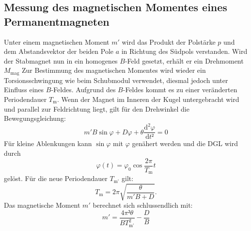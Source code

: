 \subsection{Messung des magnetischen Momentes eines Permanentmagneten}
Unter einem magnetischen Moment $m'$ wird das Produkt der Polstärke $p$
 und dem Abstandsvektor der beiden Pole $a$ in Richtung des Südpols verstanden.
  Wird der Stabmagnet nun in ein homogenes $B$-Feld gesetzt,
   erhält er ein Drehmoment $M_{\text{mag}}$
Zur Bestimmung des magnetischen Momentes wird wieder ein Torsionsschwingung wie
 beim Schubmodul verwendet, diesmal jedoch unter Einfluss eines $B$-Feldes.
  Aufgrund des $B$-Feldes kommt es zu einer veränderten Periodendauer $T_\text{m}$.  Wenn
  der Magnet im Inneren der Kugel untergebracht wird und parallel zur Feldrichtung
  liegt, gilt für den Drehwinkel \varphi die Bewegungsgleichung:
  \begin{equation}
    m'B\sin\varphi + D\varphi + \theta\frac{\text{d}^2\varphi}{\text{d}t²} = 0
  \end{equation}
  Für kleine Ablenkungen kann $\sin \varphi$ mit $\varphi$ genähert werden und die DGL wird durch
  \begin{equation}
    \varphi(t) = \varphi_\text{0} \cos\frac{2\pi}{T_\text{m}}t
  \end{equation}
  gelöst. Für die neue Periodendauer $T_\text{m'}$ gilt:
  \begin{equation}
    T_\text{m} = 2\pi\sqrt{\frac{\theta}{m'B + D}}\text{.}
  \end{equation}
Das magnetische Moment $m'$ berechnet sich schlussendlich mit:
\begin{equation}
  m' = \frac{4\pi²\theta}{BT_\text{m'}^2} - \frac{D}{B}
\end{equation}

